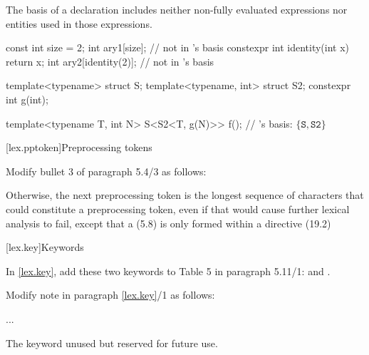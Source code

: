 \begin{undecided}
\begin{std.txt}

\alinea
\enternote
The basis of a declaration includes neither non-fully evaluated expressions nor
entities used in those expressions.
\begin{example}
   \begin{codeblock}
    const int size = 2;
    int ary1[size];                         //  not in 's basis
    constexpr int identity(int x) { return x; }
    int ary2[identity(2)];                  //  not in 's basis

    template<typename> struct S;
    template<typename, int> struct S2;
    constexpr int g(int);

    template<typename T, int N>
    S<S2<T, g(N)>> f();                     // 's basis: $\{ \mathtt{S}, \mathtt{S2} \}$ 
   \end{codeblock}
\end{example}
\exitnote

\end{std.txt}
\end{undecided}

\begin{after}
\setcounter{section}{3}
[lex.pptoken]{Preprocessing tokens}

Modify bullet 3 of paragraph 5.4/3 as follows:

\begin{std.txt}
Otherwise, the next preprocessing token is
the longest sequence of characters
that could constitute a preprocessing token,
even if that would cause further lexical analysis to fail,
except that a  (5.8)
is only formed
within a  directive (19.2)
\end{std.txt}
\end{after}

\setcounter{section}{10}
[lex.key]{Keywords}

In \ref{lex.key}, add these two keywords to Table 5 in paragraph
5.11/1:  and .

\noindent
Modify note in paragraph \ref{lex.key}/1 as follows:
\begin{std.txt}
    \resetalinea[0]
    \alinea
    ...


    \enternote
    The   keyword 
    unused but   
    reserved for future use.
    \exitnote
\end{std.txt}
